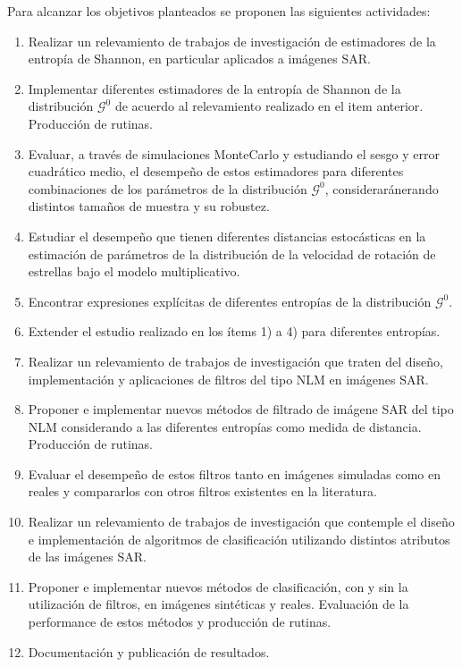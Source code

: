 \documentclass[11pt]{article}
\begin{document}
Para alcanzar los objetivos planteados se proponen las siguientes actividades:
\begin{enumerate}
	\item Realizar un relevamiento de trabajos de investigación de estimadores de la entropía de Shannon, en particular aplicados a imágenes SAR.
	\item Implementar diferentes estimadores de la entropía de Shannon de la distribución $\mathcal{G}^{0}$ de acuerdo al relevamiento realizado en el item anterior. Producción de rutinas.
	\item Evaluar, a través de simulaciones MonteCarlo y estudiando el sesgo y error cuadrático medio, el desempeño de estos estimadores para diferentes combinaciones de los parámetros de la distribución $\mathcal{G}^{0}$, consideraránerando distintos tamaños de muestra y su robustez.
	\item Estudiar el desempeño que tienen diferentes distancias estocásticas en la estimación de parámetros de la distribución de la velocidad de rotación de estrellas bajo el modelo multiplicativo.
	\item Encontrar expresiones explícitas de diferentes entropías de la distribución $\mathcal{G}^{0}$.
	\item Extender el estudio realizado en los ítems 1) a 4) para diferentes entropías.
	\item Realizar un relevamiento de trabajos de investigación que traten del diseño, implementación y aplicaciones de filtros del tipo NLM en imágenes SAR.
	\item Proponer e implementar nuevos métodos de filtrado de imágene SAR del tipo NLM considerando a las diferentes entropías  como medida de distancia. Producción de rutinas.
	\item Evaluar el desempeño de estos filtros tanto en imágenes simuladas como en reales  y compararlos con otros filtros existentes en la literatura.
	\item Realizar un relevamiento de trabajos de investigación que contemple el diseño e implementación de algoritmos de clasificación utilizando distintos atributos de las imágenes SAR.
	\item Proponer e implementar nuevos métodos de clasificación, con y sin la utilización de filtros, en imágenes sintéticas y reales. Evaluación de la performance de estos métodos y producción de rutinas.
	\item Documentación y publicación de resultados.
	
\end{enumerate}
\end{document}
